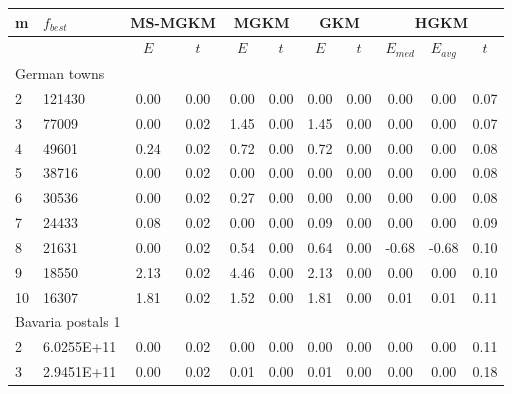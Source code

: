 {\footnotesize
\centering
\begin{longtable}{@{}llccccccccc@{}}
m  & $f_{best}$ & \multicolumn{2}{c}{MS-MGKM} & \multicolumn{2}{c}{MGKM} & \multicolumn{2}{c}{GKM} & \multicolumn{3}{c}{HGKM}      \\ \midrule
   &            & $E$          & $t$          & $E$         & $t$        & $E$         & $t$       & $E_{med}$ & $E_{avg}$ & $t$   \\
\multicolumn{11}{l}{German towns}                                                                                                  \\
2  & 121430     & 0.00         & 0.00         & 0.00        & 0.00       & 0.00        & 0.00      & 0.00      & 0.00      & 0.07  \\
3  & 77009      & 0.00         & 0.02         & 1.45        & 0.00       & 1.45        & 0.00      & 0.00      & 0.00      & 0.07  \\
4  & 49601      & 0.24         & 0.02         & 0.72        & 0.00       & 0.72        & 0.00      & 0.00      & 0.00      & 0.08  \\
5  & 38716      & 0.00         & 0.02         & 0.00        & 0.00       & 0.00        & 0.00      & 0.00      & 0.00      & 0.08  \\
6  & 30536      & 0.00         & 0.02         & 0.27        & 0.00       & 0.00        & 0.00      & 0.00      & 0.00      & 0.08  \\
7  & 24433      & 0.08         & 0.02         & 0.00        & 0.00       & 0.09        & 0.00      & 0.00      & 0.00      & 0.09  \\
8  & 21631      & 0.00         & 0.02         & 0.54        & 0.00       & 0.64        & 0.00      & -0.68     & -0.68     & 0.10  \\
9  & 18550      & 2.13         & 0.02         & 4.46        & 0.00       & 2.13        & 0.00      & 0.00      & 0.00      & 0.10  \\
10 & 16307      & 1.81         & 0.02         & 1.52        & 0.00       & 1.81        & 0.00      & 0.01      & 0.01      & 0.11  \\
\multicolumn{11}{l}{Bavaria postals 1}                                                                                             \\
2  & 6.0255E+11 & 0.00         & 0.02         & 0.00        & 0.00       & 0.00        & 0.00      & 0.00      & 0.00      & 0.11  \\
3  & 2.9451E+11 & 0.00         & 0.02         & 0.01        & 0.00       & 0.01        & 0.00      & 0.00      & 0.00      & 0.18  \\

\end{longtable}}
